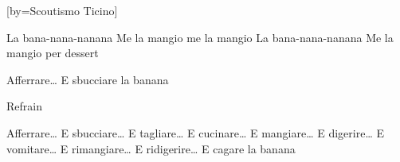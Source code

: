 [by={Scoutismo Ticino}]

\beginverse
{}
\endverse

\beginchorus
La bana-nana-nanana
Me la mangio me la mangio
La bana-nana-nanana
Me la mangio per dessert
\endchorus

\beginverse
Afferrare… 
E sbucciare la banana 
\endverse

\beginchorus
Refrain
\endchorus

\beginverse
{}
Afferrare… 
E sbucciare… 
E tagliare… 
E cucinare… 
E mangiare… 
E digerire… 
E vomitare… 
E rimangiare… 
E ridigerire… 
E cagare la banana 
\endverse

\endsong
{}

